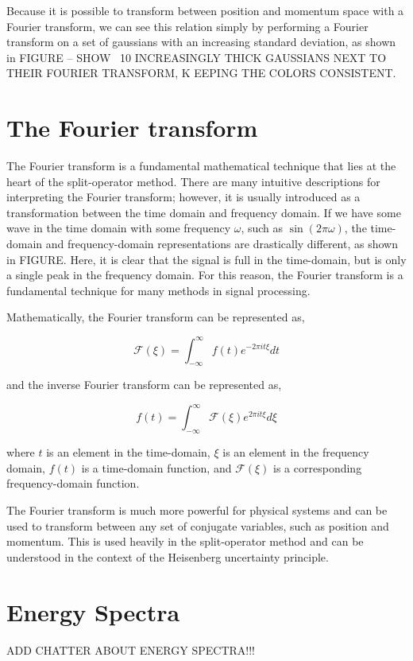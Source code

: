 Because it is possible to transform between position and momentum space with a Fourier transform, we can see this relation simply by performing a Fourier transform on a set of gaussians with an increasing standard deviation, as shown in FIGURE -- SHOW ~10 INCREASINGLY THICK GAUSSIANS NEXT TO THEIR FOURIER TRANSFORM, K
EEPING THE COLORS CONSISTENT.

\section{The Fourier transform}

The Fourier transform is a fundamental mathematical technique that lies at the heart of the split-operator method.
There are many intuitive descriptions for interpreting the Fourier transform; however, it is usually introduced as a transformation between the time domain and frequency domain.
If we have some wave in the time domain with some frequency $\omega$, such as $\sin(2\pi\omega)$, the time-domain and frequency-domain representations are drastically different, as shown in FIGURE.
Here, it is clear that the signal is full in the time-domain, but is only a single peak in the frequency domain.
For this reason, the Fourier transform is a fundamental technique for many methods in signal processing.

Mathematically, the Fourier transform can be represented as,

$$
\mathcal{F}(\xi) = \int_{-\infty}^{\infty}f(t)e^{-2\pi i t \xi}dt
$$

and the inverse Fourier transform can be represented as,

$$
f(t) = \int_{-\infty}^{\infty}\mathcal{F}(\xi)e^{2\pi i t \xi}d\xi
$$

where $t$ is an element in the time-domain, $\xi$ is an element in the frequency domain, $f(t)$ is a time-domain function, and $\mathcal{F}(\xi)$ is a corresponding frequency-domain function.

The Fourier transform is much more powerful for physical systems and can be used to transform between any set of conjugate variables, such as position and momentum.
This is used heavily in the split-operator method and can be understood in the context of the Heisenberg uncertainty principle.


\section{Energy Spectra}

ADD CHATTER ABOUT ENERGY SPECTRA!!!

